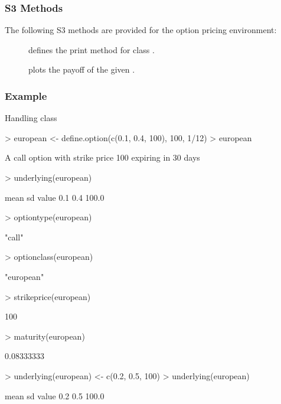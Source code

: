 \begin{Example}
\begin{itemize}
\subsubsection{S3 Methods}

The following S3 methods are provided for the option pricing environment:

\begin{description}
\item[] defines the print method for class .
\item[] plots the payoff of the given .
\end{description}

\subsubsection{Example}

\begin{Example} Handling class 
\label{ex:option}
\begin{Schunk}
\begin{Sinput}
> european <- define.option(c(0.1, 0.4, 100), 100, 1/12)
> european
\end{Sinput}
\begin{Soutput}
A call option with strike price 100
expiring in 30 days
\end{Soutput}
\begin{Sinput}
> underlying(european)
\end{Sinput}
\begin{Soutput}
 mean    sd value 
  0.1   0.4 100.0 
\end{Soutput}
\begin{Sinput}
> optiontype(european)
\end{Sinput}
\begin{Soutput}
[1] "call"
\end{Soutput}
\begin{Sinput}
> optionclass(european)
\end{Sinput}
\begin{Soutput}
[1] "european"
\end{Soutput}
\begin{Sinput}
> strikeprice(european)
\end{Sinput}
\begin{Soutput}
[1] 100
\end{Soutput}
\begin{Sinput}
> maturity(european)
\end{Sinput}
\begin{Soutput}
[1] 0.08333333
\end{Soutput}
\begin{Sinput}
> underlying(european) <- c(0.2, 0.5, 100)
> underlying(european)
\end{Sinput}
\begin{Soutput}
 mean    sd value 
  0.2   0.5 100.0 
\end{Soutput}
\end{Schunk}
\end{Example}


\end{itemize}
\end{Example}
